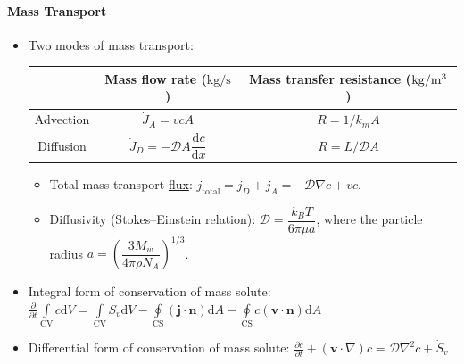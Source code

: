\documentclass[10pt, a4paper, table]{article}
\begin{document}
\begin{mdframed} \vspace{-.5cm}
\paragraph{Mass Transport}

\begin{itemize}
\item Two modes of mass transport:

    \begin{center}
    \begin{tabular}{ccc}
    \toprule
     & Mass flow rate ($\mathrm{kg/s}$) & Mass transfer resistance ($\rm kg/m^3$) \\ 
    \midrule
    Advection 
    & $\dot{J}_A = v c A$ 
    & $R = 1/k_m A$ \\[1.5ex]
    
    Diffusion 
    & $\dot{J}_D = - \mathcal{D} A \dfrac{\mathrm{d}c}{\mathrm{d}x}$ 
    & $R = L/\mathcal{D} A$ \\
    
    \bottomrule
    \end{tabular}
    \end{center}
    
    \begin{itemize}
        \item Total mass transport \underline{flux}: $j_{\text{total}} = j_D + j_A = -\mathcal{D} \nabla c + vc$.
    
        \item Diffusivity (Stokes--Einstein relation): $\mathcal{D} = \dfrac{k_B T}{6\pi \mu a}$, where the particle radius $a = \left(\dfrac{3M_w}{4\pi \rho N_A}\right)^{1/3}$.
    \end{itemize}

    \item Integral form of conservation of mass solute:
    $ \displaystyle
        \frac{\partial}{\partial t} \int\limits_{\mathrm{CV}} c \mathrm{d}V = \int\limits_{\mathrm{CV}} \dot{S_{v}} \mathrm{d}V - \oint\limits_{\mathrm{CS}} (\mathbf{j} \cdot \mathbf{n}) \mathrm{d}A - \oint\limits_{\mathrm{CS}} c (\mathbf{v} \cdot \mathbf{n}) \mathrm{d}A 
    $
    
    \item Differential form of conservation of mass solute:
    $ \displaystyle
        \frac{\partial c}{\partial t} + (\mathbf{v} \cdot \nabla)c = \mathcal{D}\nabla^2 c + \dot{S}_{v}
    $
\end{itemize}


\end{mdframed}
\end{document}
